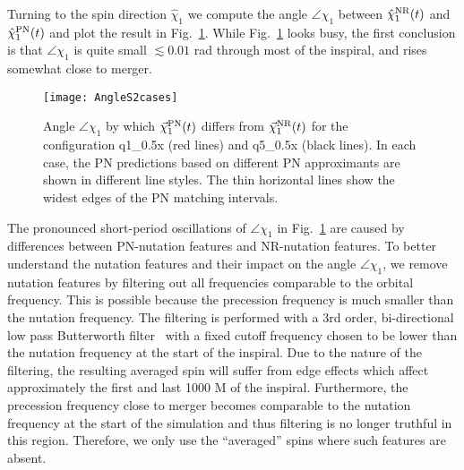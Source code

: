 \documentclass[aps,prd,amsmath,floatfix,twocolumn,superscriptaddress,nofootinbib,showpacs]{revtex4-1}
\begin{document}
Turning to the spin direction $\hat{\chi}_{1}$ we compute the angle
$\angle \chi_{1}$ between $\hat{\chi}_{1}^{\rm NR}(t)$ and
$\hat\chi_{1}^{\rm PN}(t) $ and plot the result in
Fig.~\ref{fig:2casesSpinAngles}. While Fig.~\ref{fig:2casesSpinAngles}
looks busy, the first conclusion is that $\angle \chi_{1}$ is quite
small $\lesssim 0.01$ rad through most of the inspiral, and rises
somewhat close to merger.

\begin{figure}
  \texttt{[image: AngleS2cases]}
  \caption{Angle $\angle \chi_{1}$ by which $\vec{\chi}_{1}^{\rm PN}(t)$
    differs from $\vec{\chi}_{1}^{\rm NR}(t)$ for the configuration
    q1\_0.5x (red lines) and q5\_0.5x (black lines).  In each case,
    the PN predictions based on different PN approximants are shown in
    different line styles. The thin horizontal lines show the widest
    edges of the PN matching intervals.}
  \label{fig:2casesSpinAngles}
\end{figure}

The pronounced short-period oscillations of $\angle\chi_1$ in
Fig.~\ref{fig:2casesSpinAngles} are caused by differences between
PN-nutation features and NR-nutation features. To better understand
the nutation features and their impact on the angle $\angle \chi_{1}$,
we remove nutation features by filtering out all frequencies
comparable to the orbital frequency. This is possible because the
precession frequency is much smaller than the nutation frequency. The
filtering is performed with a 3rd order, bi-directional low pass
Butterworth filter~\cite{paarmann2001design} with a fixed cutoff
frequency chosen to be lower than the nutation frequency at the start
of the inspiral. Due to the nature of the filtering, the resulting
averaged spin will suffer from edge effects which affect approximately
the first and last 1000 M of the inspiral. Furthermore, the precession
frequency close to merger becomes comparable to the nutation frequency
at the start of the simulation and thus filtering is no longer
truthful in this region. Therefore, we only use the ``averaged'' spins
where such features are absent.
\end{document}
